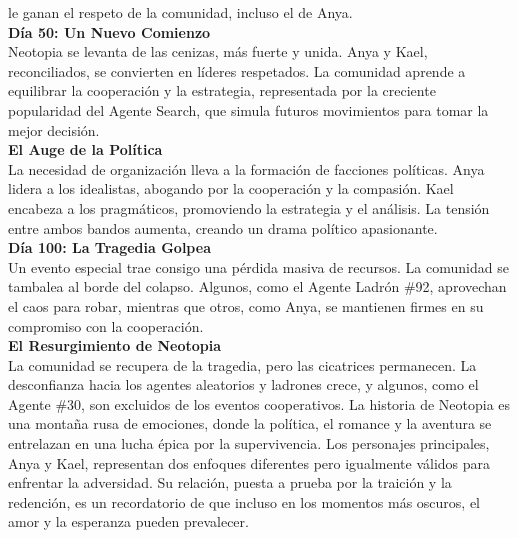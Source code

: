 \documentclass{article}
\begin{document}
\begin{tcolorbox}[enhanced, breakable,skin first=enhanced, skin middle=enhanced, skin last=enhanced]
      le ganan el respeto de la comunidad, incluso el de Anya.
      \\\textbf{Día 50: Un Nuevo Comienzo}\\
      Neotopia se levanta de las cenizas, más fuerte y unida. Anya y Kael, reconciliados, se convierten en líderes respetados. La comunidad aprende a equilibrar la cooperación
      y la estrategia, representada por la creciente popularidad del Agente Search, que simula futuros movimientos para tomar la mejor decisión.
      \\\textbf{El Auge de la Política}\\
      La necesidad de organización lleva a la formación de facciones políticas. Anya lidera a los idealistas, abogando por la cooperación y la compasión. Kael encabeza a los
      pragmáticos, promoviendo la estrategia y el análisis. La tensión entre ambos bandos aumenta, creando un drama político apasionante.
      \\\textbf{Día 100: La Tragedia Golpea}\\
      Un evento especial trae consigo una pérdida masiva de recursos. La comunidad se tambalea al borde del colapso. Algunos, como el Agente Ladrón \#92, aprovechan el caos
      para robar, mientras que otros, como Anya, se mantienen firmes en su compromiso con la cooperación.
      \\\textbf{El Resurgimiento de Neotopia}\\
      La comunidad se recupera de la tragedia, pero las cicatrices permanecen. La desconfianza hacia los agentes aleatorios y ladrones crece, y algunos, como el Agente \#30, son excluidos de los eventos cooperativos. La historia de Neotopia es una montaña rusa de emociones, donde la política, el romance y la aventura se entrelazan en una lucha épica por la supervivencia. Los personajes principales, Anya y Kael, representan dos enfoques diferentes pero igualmente válidos para enfrentar la adversidad. Su relación, puesta a prueba por la traición y la redención, es un recordatorio de que incluso en los momentos más oscuros, el amor y la esperanza pueden prevalecer.


\end{tcolorbox}
\end{document}

